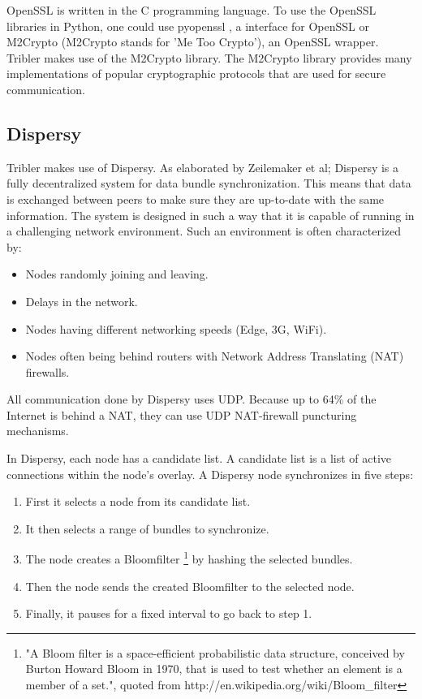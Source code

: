 		OpenSSL is written in the C programming language. To use the OpenSSL libraries in Python, one could use pyopenssl \cite{pyopensslgithub}, a interface for OpenSSL or M2Crypto \cite{m2cryptogithub} (M2Crypto stands for 'Me Too Crypto'), an OpenSSL wrapper. Tribler makes use of the M2Crypto library. The M2Crypto library provides many implementations of popular cryptographic protocols that are used for secure communication.
		
	\subsection{Dispersy}
	\label{sec:dispersy}
		Tribler makes use of Dispersy. As elaborated by Zeilemaker et al; Dispersy \cite{zeilemaker2013dispersy} is a fully decentralized system for data bundle synchronization. This means that data is exchanged between peers to make sure they are up-to-date with the same information. The system is designed in such a way that it is capable of running in a challenging network environment. Such an environment is often characterized by:
		\begin{itemize}
			\item Nodes randomly joining and leaving.
			\item Delays in the network.
			\item Nodes having different networking speeds (Edge, 3G, WiFi).
			\item Nodes often being behind routers with Network Address Translating (NAT) firewalls.
		\end{itemize}
		
		All communication done by Dispersy uses UDP. Because up to 64\% of the Internet is behind a NAT, they can use UDP NAT-firewall puncturing mechanisms\cite{zeilemaker2013dispersy}.
		
		In Dispersy, each node has a candidate list. A candidate list is a list of active connections within the node's overlay. A Dispersy node synchronizes in five steps:
		
		\begin{enumerate}
			\item First it selects a node from its candidate list.
			\item It then selects a range of bundles to synchronize.
			\item The node creates a Bloomfilter \footnote{"A Bloom filter is a space-efficient probabilistic data structure, conceived by Burton Howard Bloom in 1970, that is used to test whether an element is a member of a set.", quoted from http://en.wikipedia.org/wiki/Bloom\_filter} by hashing the selected bundles.
			\item Then the node sends the created Bloomfilter to the selected node.
			\item Finally, it pauses for a fixed interval to go back to step 1.
		\end{enumerate}
		
